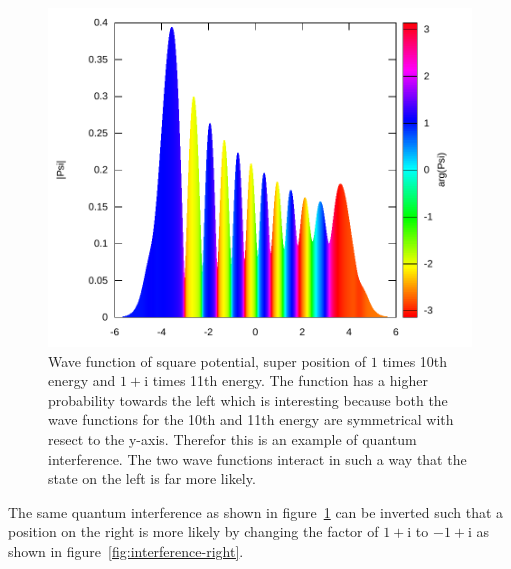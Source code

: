 \documentclass[11pt,DIV=10,final]{scrreprt} %
\newcommand{\mi}{{\text{i}}}
\begin{document}
\begin{minipage}{\textwidth}
\begin{figure}[H]
\centering
\includegraphics[width=\textwidth]{plots/super-square-10_1-11_1+i.pdf}
\caption{\label{fig:interfence-left}Wave function of square potential, super position of $1$ times 10th energy and $1+\mi$ times 11th energy. The function has a higher probability towards the left which
  is interesting because both the wave functions for the 10th and 11th energy are symmetrical with resect to the y-axis. Therefor this is an example of quantum interference. The two wave functions
  interact in such a way that the state on the left is far more likely.}
\end{figure}
The same quantum interference as shown in figure~\ref{fig:interfence-left} can be inverted such that a position on the right is more likely by changing the factor of $1+\mi$ to $-1+\mi$ as shown in
figure~\ref{fig:interference-right}.
\end{minipage}
\end{document}
